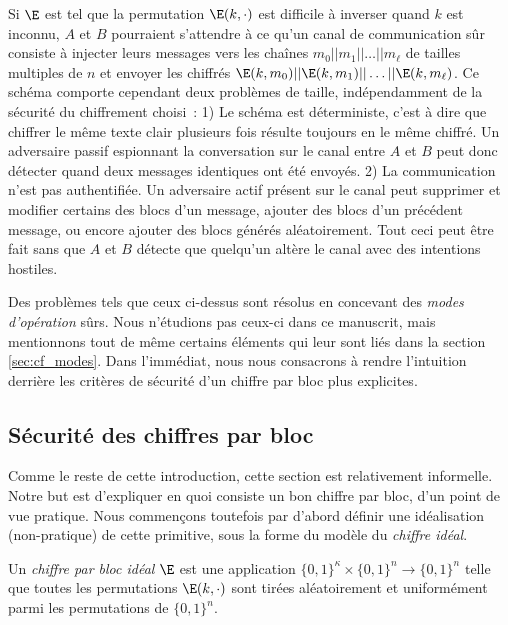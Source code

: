 Si $\E$ est tel que la permutation $\E(k,\cdot)$ est difficile à inverser quand $k$ est inconnu, $A$ et $B$
pourraient s'attendre à ce qu'un canal de communication sûr consiste à injecter leurs messages
vers les chaînes
$m_0||m_1||\ldots||m_\ell$ de tailles multiples de $n$ et envoyer les chiffrés
$\E(k,m_0)||\E(k,m_1)||\ldots||\E(k,m_\ell)$.
Ce schéma comporte cependant deux problèmes de taille, indépendamment de la sécurité du chiffrement choisi~:
1) Le schéma est déterministe, c'est à dire que chiffrer le même texte clair plusieurs fois résulte toujours en le
même chiffré. Un adversaire passif espionnant la conversation sur le canal entre $A$ et $B$ peut donc
détecter quand deux messages identiques ont été envoyés. 2) La communication n'est pas authentifiée. Un
adversaire actif présent sur le canal peut supprimer et modifier certains des blocs d'un message,
ajouter des blocs d'un précédent message, ou encore ajouter des blocs générés aléatoirement. Tout ceci peut
être fait sans que $A$ et $B$ détecte que quelqu'un altère le canal avec des intentions hostiles. 

Des problèmes tels que ceux ci-dessus sont résolus en concevant des \emph{modes d'opération} sûrs. Nous n'étudions
pas ceux-ci dans ce manuscrit, mais mentionnons tout de même certains éléments qui leur sont liés dans
la section \ref{sec:cf_modes}. Dans l'immédiat, nous nous consacrons à rendre l'intuition derrière les critères de sécurité
d'un chiffre par bloc plus explicites. 

\subsection{Sécurité des chiffres par bloc}

Comme le reste de cette introduction, cette section est relativement informelle. Notre but est d'expliquer en
quoi consiste un bon chiffre par bloc, d'un point de vue pratique. Nous commençons toutefois par d'abord
définir une idéalisation (non-pratique) de cette primitive, sous la forme du modèle du \emph{chiffre idéal}.

\begin{fdefi}
Un \emph{chiffre par bloc idéal} $\E$ est une application
$\{0,1\}^\kappa \times \{0,1\}^n \rightarrow \{0,1\}^n$ telle que toutes les permutations
$\E(k,\cdot)$ sont tirées aléatoirement et uniformément parmi les permutations de $\{0,1\}^n$.
\end{fdefi}

